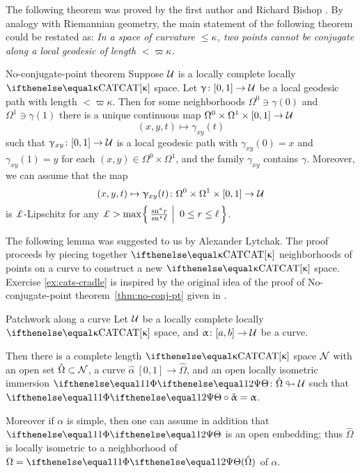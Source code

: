 The following theorem was proved by the first author and Richard Bishop \cite{a-b:h-c}.
By analogy with Riemannian geometry, the main statement of the following theorem could be restated as: 
\emph{In a space of curvature $\le\kappa$, two points cannot be conjugate along a local geodesic of length $<\varpi\kappa$.}


\begin{thm}{No-conjugate-point theorem}
\label{thm:no-conj-pt}
Suppose $\mathcal{U}$ is a locally complete locally $\CAT\kappa$ space.
Let $\gamma\:[0,1]\to\spc{U}$ be a local geodesic path with length $<\varpi\kappa$.
Then for some neighborhoods $\Omega^0\ni \gamma(0)$ and $\Omega^1\ni\gamma(1)$ 
there is a unique continuous map $\Omega^0\times \Omega^1\times[0,1]\to\spc{U}$
\[(x,y,t)\mapsto\gamma_{x y}(t)\]
such that 
$\gamma_{x y}\:[0,1]\to\spc{U}$ is a local geodesic path with 
$\gamma_{x y}(0)=x$ and 
$\gamma_{x y}(1)=y$ for each $(x,y)\in\Omega^0\times\Omega^1$,
and the family $\gamma_{x y}$ contains $\gamma$.  
Moreover, we can assume that the map 
\[(x,y,t)\mapsto\gamma_{x y}(t)\:\Omega^0\times\Omega^1\times[0,1]\to\spc{U}\] 
is $\Lip$-Lipschitz
for any
$\Lip>\max\set{\tfrac{\sn\kappa r}{\sn\kappa \ell}}{0\le r\le \ell}$.
\end{thm}

The following lemma was suggested to us by Alexander Lytchak.
The proof proceeds by piecing together $\CAT{\kappa}$  neighborhoods of points on a curve to construct a new $\CAT{\kappa}$ space.  
Exercise \ref{ex:cats-cradle} is inspired by the original idea of the proof of No-conjugate-point theorem~\ref{thm:no-conj-pt} given in \cite{a-b:h-c}.

\begin{thm}{Patchwork along a curve}
\label{lem:patch}
Let $\mathcal{U}$ be a locally complete locally $\CAT\kappa$ space, 
and $\alpha\:[a,b]\to\spc{U}$ be a curve.

Then there is a complete length $\CAT\kappa$ space $\mathcal{N}$
with an open set $\hat\Omega\subset \spc{N}$,
a curve $\hat\alpha\:[0,1]\to\hat\Omega$,
and an open locally isometric immersion 
 $\map\:\hat\Omega\looparrowright\spc{U}$ such that
$\map\circ\hat\alpha=\alpha$.

Moreover if $\alpha$ is simple, then one can assume in addition that $\map$ is an open embedding;
thus $\hat\Omega$ is locally isometric to a neighborhood of $\Omega=\map(\hat\Omega)$ of $\alpha$.
\end{thm}



